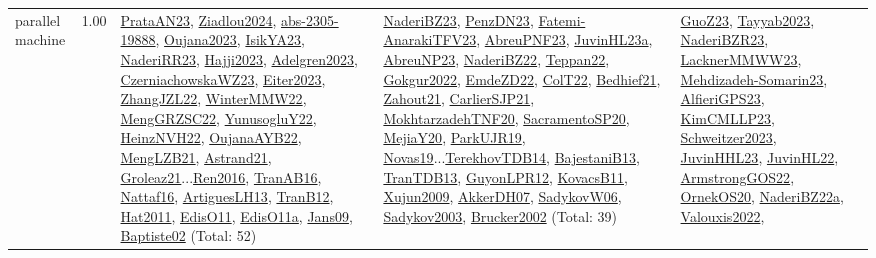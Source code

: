 {\begin{longtable}{p{3cm}r>{\raggedright\arraybackslash}p{6cm}>{\raggedright\arraybackslash}p{6cm}>{\raggedright\arraybackslash}p{8cm}}
\index{parallel machine}\index{Classification!parallel machine}parallel machine &  1.00 & \hyperref[detail:PrataAN23]{PrataAN23}, \hyperref[detail:Ziadlou2024]{Ziadlou2024}, \hyperref[detail:abs-2305-19888]{abs-2305-19888}, \hyperref[detail:Oujana2023]{Oujana2023}, \hyperref[detail:IsikYA23]{IsikYA23}, \hyperref[detail:NaderiRR23]{NaderiRR23}, \hyperref[detail:Hajji2023]{Hajji2023}, \hyperref[detail:Adelgren2023]{Adelgren2023}, \hyperref[detail:CzerniachowskaWZ23]{CzerniachowskaWZ23}, \hyperref[detail:Eiter2023]{Eiter2023}, \hyperref[detail:ZhangJZL22]{ZhangJZL22}, \hyperref[detail:WinterMMW22]{WinterMMW22}, \hyperref[detail:MengGRZSC22]{MengGRZSC22}, \hyperref[detail:YunusogluY22]{YunusogluY22}, \hyperref[detail:HeinzNVH22]{HeinzNVH22}, \hyperref[detail:OujanaAYB22]{OujanaAYB22}, \hyperref[detail:MengLZB21]{MengLZB21}, \hyperref[detail:Astrand21]{Astrand21}, \hyperref[detail:Groleaz21]{Groleaz21}...\hyperref[detail:Ren2016]{Ren2016}, \hyperref[detail:TranAB16]{TranAB16}, \hyperref[detail:Nattaf16]{Nattaf16}, \hyperref[detail:ArtiguesLH13]{ArtiguesLH13}, \hyperref[detail:TranB12]{TranB12}, \hyperref[detail:Hat2011]{Hat2011}, \hyperref[detail:EdisO11]{EdisO11}, \hyperref[detail:EdisO11a]{EdisO11a}, \hyperref[detail:Jans09]{Jans09}, \hyperref[detail:Baptiste02]{Baptiste02} (Total: 52) & \hyperref[detail:NaderiBZ23]{NaderiBZ23}, \hyperref[detail:PenzDN23]{PenzDN23}, \hyperref[detail:Fatemi-AnarakiTFV23]{Fatemi-AnarakiTFV23}, \hyperref[detail:AbreuPNF23]{AbreuPNF23}, \hyperref[detail:JuvinHL23a]{JuvinHL23a}, \hyperref[detail:AbreuNP23]{AbreuNP23}, \hyperref[detail:NaderiBZ22]{NaderiBZ22}, \hyperref[detail:Teppan22]{Teppan22}, \hyperref[detail:Gokgur2022]{Gokgur2022}, \hyperref[detail:EmdeZD22]{EmdeZD22}, \hyperref[detail:ColT22]{ColT22}, \hyperref[detail:Bedhief21]{Bedhief21}, \hyperref[detail:Zahout21]{Zahout21}, \hyperref[detail:CarlierSJP21]{CarlierSJP21}, \hyperref[detail:MokhtarzadehTNF20]{MokhtarzadehTNF20}, \hyperref[detail:SacramentoSP20]{SacramentoSP20}, \hyperref[detail:MejiaY20]{MejiaY20}, \hyperref[detail:ParkUJR19]{ParkUJR19}, \hyperref[detail:Novas19]{Novas19}...\hyperref[detail:TerekhovTDB14]{TerekhovTDB14}, \hyperref[detail:BajestaniB13]{BajestaniB13}, \hyperref[detail:TranTDB13]{TranTDB13}, \hyperref[detail:GuyonLPR12]{GuyonLPR12}, \hyperref[detail:KovacsB11]{KovacsB11}, \hyperref[detail:Xujun2009]{Xujun2009}, \hyperref[detail:AkkerDH07]{AkkerDH07}, \hyperref[detail:SadykovW06]{SadykovW06}, \hyperref[detail:Sadykov2003]{Sadykov2003}, \hyperref[detail:Brucker2002]{Brucker2002} (Total: 39) & \hyperref[detail:GuoZ23]{GuoZ23}, \hyperref[detail:Tayyab2023]{Tayyab2023}, \hyperref[detail:NaderiBZR23]{NaderiBZR23}, \hyperref[detail:LacknerMMWW23]{LacknerMMWW23}, \hyperref[detail:Mehdizadeh-Somarin23]{Mehdizadeh-Somarin23}, \hyperref[detail:AlfieriGPS23]{AlfieriGPS23}, \hyperref[detail:KimCMLLP23]{KimCMLLP23}, \hyperref[detail:Schweitzer2023]{Schweitzer2023}, \hyperref[detail:JuvinHHL23]{JuvinHHL23}, \hyperref[detail:JuvinHL22]{JuvinHL22}, \hyperref[detail:ArmstrongGOS22]{ArmstrongGOS22}, \hyperref[detail:OrnekOS20]{OrnekOS20}, \hyperref[detail:NaderiBZ22a]{NaderiBZ22a}, \hyperref[detail:Valouxis2022]{Valouxis2022}, 
\end{longtable}}
